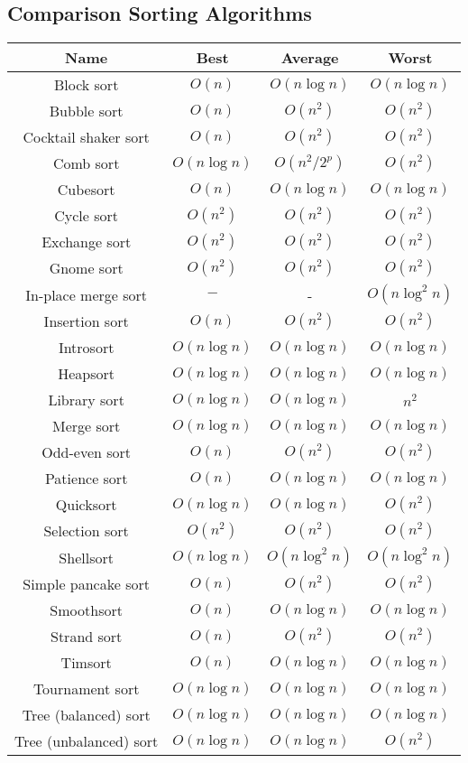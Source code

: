 \documentclass{article}
\begin{document}
\subsection*{Comparison Sorting Algorithms}

\begin{table}[ht]
	\centering
	\scriptsize
	\begin{tabular}{cccc}
		\textbf{Name} & \textbf{Best}& \textbf{Average} & \textbf{Worst}\\
		\hline
		Block sort & $O(n)$ & $O(n\log{n})$ & $O(n\log{n})$ \\
		Bubble sort & $O(n)$ & $O(n^2)$ & $O(n^2)$ \\
		Cocktail shaker sort & $O(n)$ & $O(n^2)$ & $O(n^2)$ \\
		Comb sort\footnotemark[10] & $O(n\log{n})$ & $O(n^2/2^p)$ & $O(n^2)$ \\
		Cubesort & $O(n)$ & $O(n\log{n})$ & $O(n\log{n})$ \\
		Cycle sort & $O(n^2)$ & $O(n^2)$ & $O(n^2)$ \\
		Exchange sort & $O(n^2)$ & $O(n^2)$ & $O(n^2)$ \\
		Gnome sort & $O(n^2)$ & $O(n^2)$ & $O(n^2)$ \\
		In-place merge sort & $ - $ & - & $O(n\log^2{n})$ \\
		Insertion sort &$O(n)$ & $O(n^2)$ & $O(n^2)$ \\
		Introsort & $O(n\log{n})$ & $O(n\log{n})$ & $O(n\log{n})$ \\
		Heapsort & $O(n\log{n})$ & $O(n\log{n})$ & $O(n\log{n})$ \\
		Library sort & $O(n\log{n})$ & $O(n\log{n})$ & $n^2$ \\
		Merge sort & $O(n\log{n})$ & $O(n\log{n})$ & $O(n\log{n})$ \\
		Odd-even sort & $O(n)$ & $O(n^2)$ & $O(n^2)$ \\
		Patience sort & $O(n)$ & $O(n\log{n})$ & $O(n\log{n})$ \\
		Quicksort & $O(n\log{n})$ & $O(n\log{n})$ & $O(n^2)$ \\
		Selection sort & $O(n^2)$ & $O(n^2)$ & $O(n^2)$\\
		Shellsort & $O(n \log{n})$& $O(n \log^2{n})$ & $O(n \log^2{n})$ \\
		Simple pancake sort & $O(n)$ & $O(n^2)$ & $O(n^2)$ \\
		Smoothsort & $O(n)$ & $O(n\log{n})$ & $O(n\log{n})$ \\
		Strand sort & $O(n)$ & $O(n^2)$ & $O(n^2)$ \\
		Timsort & $O(n)$ & $O(n\log{n})$ & $O(n\log{n})$ \\
		Tournament sort &$O(n\log{n})$ & $O(n\log{n})$ & $O(n\log{n})$ \\
		Tree (balanced) sort &$O(n\log{n})$ & $O(n\log{n})$ & $O(n\log{n})$ \\
		Tree (unbalanced) sort &$O(n\log{n})$ & $O(n\log{n})$ & $O(n^2)$ \\
		\hline
	\end{tabular}
\end{table}
\end{document}
